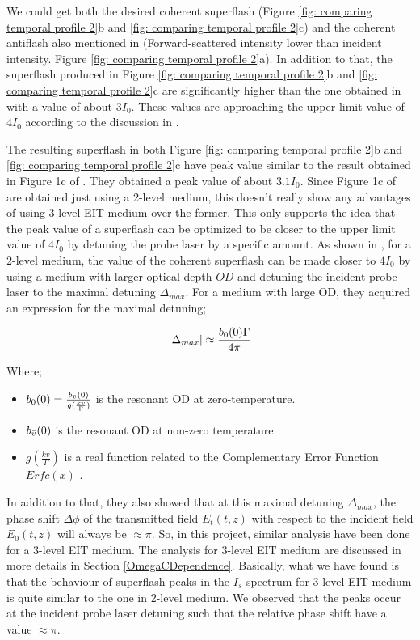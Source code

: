 We could get both the desired coherent superflash (Figure \ref{fig: comparing temporal profile 2}b and \ref{fig: comparing temporal profile 2}c) and the coherent antiflash also mentioned in  (Forward-scattered intensity lower than incident intensity. Figure \ref{fig: comparing temporal profile 2}a). In addition to that, the superflash produced in Figure \ref{fig: comparing temporal profile 2}b and \ref{fig: comparing temporal profile 2}c are significantly higher than the one obtained in  with a value of about $3I_{0}$. These values are approaching the upper limit value of $4I_{0}$ according to the discussion in .

The resulting superflash in both Figure \ref{fig: comparing temporal profile 2}b and \ref{fig: comparing temporal profile 2}c have peak value similar to the result obtained in Figure 1c of . They obtained a peak value of about $3.1 I_{0}$. Since Figure 1c of  are obtained just using a 2-level medium, this doesn't really show any advantages of using 3-level EIT medium over the former. This only supports the idea that the peak value of a superflash can be optimized to be closer to the upper limit value of $4I_{0}$ by detuning the probe laser by a specific amount. As shown in , for a 2-level medium, the value of the coherent superflash can be made closer to $4I_{0}$ by using a medium with larger optical depth $OD$ and detuning the incident probe laser to the maximal detuning $\Delta_{max}$. For a medium with large OD, they acquired an expression for the maximal detuning;

\begin{equation}
    \abs{\Delta_{max}} \approx \frac{b_{0}(0) \Gamma}{4\pi} 
\end{equation}

\newpage

Where;

\begin{itemize}
    \item $b_{0}(0) = \frac{b_{\Bar{v}}(0)}{g(\frac{kv}{\Gamma})}$ is the resonant OD at zero-temperature. 
    \item $b_{\Bar{v}}(0)$ is the resonant OD at non-zero temperature.
    \item $g(\frac{kv}{\Gamma})$ is a real function related to the Complementary Error Function $Erfc(x)$ \cite{abramowitz1965ia}.
\end{itemize}

In addition to that, they also showed that at this maximal detuning $\Delta_{max}$, the phase shift $\Delta\phi$ of the transmitted field $E_{t}(t, z)$ with respect to the incident field $E_{0}(t, z)$ will always be $\approx \pi$. So, in this project, similar analysis have been done for a 3-level EIT medium. The analysis for 3-level EIT medium are discussed in more details in Section \ref{OmegaCDependence}. Basically, what we have found is that the behaviour of superflash peaks in the $I_{s}$ spectrum for 3-level EIT medium is quite similar to the one in 2-level medium. We observed that the peaks occur at the incident probe laser detuning such that the relative phase shift have a value $\approx \pi$.


